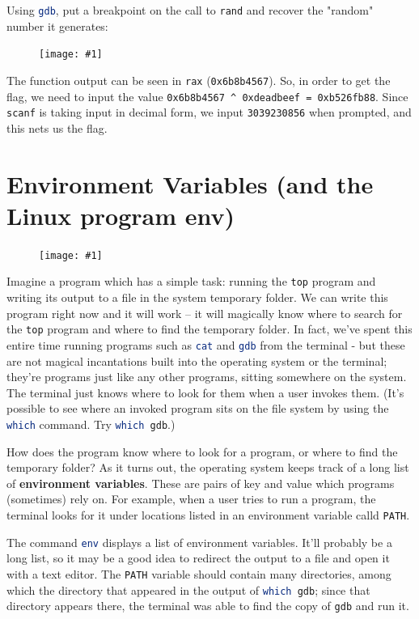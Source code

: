 \documentclass{article}
\newcommand{\displayimage}[1] {
\begin{figure}[H]
    \centering
    \texttt{[image: \#1]} 
\end{figure}
}
\newcommand{\wrapimageright}[1] {
    \begin{figure}
        \begin{center}
            \texttt{[image: \#1]} 
        \end{center}
    \end{figure}
}
\newcommand{\xcode}[2]{\colorbox{ubuntuback}{\lstinline[language=#1]|#2|}}
\newcommand{\asm}[1]{\xcode{{[x86masm]assembler}}{#1}}
\newcommand{\code}[1]{\colorbox{ubuntuback}{\texttt{#1}}}
\begin{document}
Using \xcode{bash}{gdb}, put a breakpoint on the call to \xcode{C}{rand} and recover the "random" number it generates:

\displayimage{../05_random/random_value.png}

The function output can be seen in \asm{rax} (\code{0x6b8b4567}). So, in order to get the flag, we need to input the value \code{0x6b8b4567 \^{} 0xdeadbeef = 0xb526fb88}. Since \xcode{C}{scanf} is taking input in decimal form, we input \code{3039230856} when prompted, and this nets us the flag. 
\section{Environment Variables (and the Linux program env)}

\wrapimageright{./images/environment.png}
Imagine a program which has a simple task: running the \xcode{bash}{top} program and writing its output to a file in the system temporary folder. We can write this program right now and it will work -- it will magically know where to search for the \xcode{bash}{top} program and where to find the temporary folder. In fact, we've spent this entire time running programs such as \xcode{bash}{cat} and \xcode{bash}{gdb} from the terminal - but these are not magical incantations built into the operating system or the terminal; they're programs just like any other programs, sitting somewhere on the system. The terminal just knows where to look for them when a user invokes them. (It's possible to see where an invoked program sits on the file system by using the \xcode{bash}{which} command. Try \xcode{bash}{which gdb}.)

How does the program know where to look for a program, or where to find the temporary folder? As it turns out, the operating system keeps track of a long list of \textbf{environment variables}. These are pairs of key and value which programs (sometimes) rely on. For example, when a user tries to run a program, the terminal looks for it under locations listed in an environment variable calld \code{PATH}.

The command \xcode{bash}{env} displays a list of environment variables. It'll probably be a long list, so it may be a good idea to redirect the output to a file and open it with a text editor. The \code{PATH} variable should contain many directories, among which the directory that appeared in the output of \xcode{bash}{which gdb}; since that directory appears there, the terminal was able to find the copy of \code{gdb} and run it.
\end{document}
